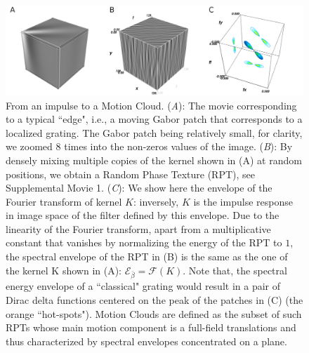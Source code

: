 \documentclass[a4paper,11pt]{article}%
\begin{document}
\begin{figure}%
	\includegraphics[width=\textwidth]{figure2}%
	 \caption{From an impulse to a Motion Cloud. (\textit{A}): The movie corresponding to a typical ``edge", i.e., a moving Gabor patch that corresponds to a localized grating. The Gabor patch being relatively small, for clarity, we zoomed 8 times into the non-zeros values of the image. (\textit{B}): By densely mixing multiple copies of the kernel shown in (A) at random positions, we obtain a Random Phase Texture (RPT), see Supplemental Movie 1. (\textit{C}):  We show here the envelope of the Fourier transform of kernel $K$: inversely, $K$ is the impulse response in image space of the filter defined by this envelope. Due to the linearity of the Fourier transform, apart from a multiplicative constant that vanishes by normalizing the energy of the  RPT to $1$, the spectral envelope of the RPT in (B) is the same as the one of the kernel K shown in (A): $\mathcal{E}_{\bar{\beta}}=\mathcal{F}(K)$. Note that, the spectral energy envelope  of a ``classical" grating would result in a pair of Dirac delta functions centered on the peak of the patches in (C) (the orange ``hot-spots"). Motion Clouds are defined as the subset of such RPTs whose main motion component is a full-field translations and thus characterized by spectral envelopes concentrated on a plane.}%
	 \label{fig:impulse}
\end{figure}
\end{document}
